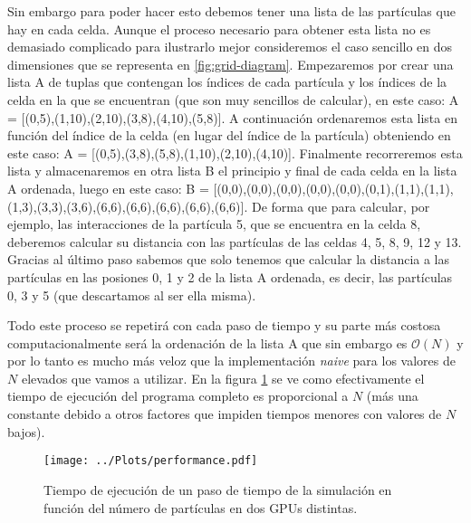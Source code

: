 Sin embargo para poder hacer esto debemos tener una lista de las partículas que hay en cada celda. Aunque el proceso necesario para obtener esta lista no es demasiado complicado para ilustrarlo mejor consideremos el caso sencillo en dos dimensiones que se representa en \ref{fig:grid-diagram}. Empezaremos por crear una lista A de tuplas que contengan los índices de cada partícula y los índices de la celda en la que se encuentran (que son muy sencillos de calcular), en este caso: A = [(0,5),(1,10),(2,10),(3,8),(4,10),(5,8)]. A continuación ordenaremos esta lista en función del índice de la celda (en lugar del índice de la partícula) obteniendo en este caso: A = [(0,5),(3,8),(5,8),(1,10),(2,10),(4,10)]. Finalmente recorreremos esta lista y almacenaremos en otra lista B el principio y final de cada celda en la lista A ordenada, luego en este caso: B = [(0,0),(0,0),(0,0),(0,0),(0,0),(0,1),(1,1),(1,1),(1,3),(3,3),(3,6),(6,6),(6,6),(6,6),(6,6),(6,6)]. De forma que para calcular, por ejemplo, las interacciones de la partícula 5, que se encuentra en la celda 8, deberemos calcular su distancia con las partículas de las celdas 4, 5, 8, 9, 12 y 13. Gracias al último paso sabemos que solo tenemos que calcular la distancia a las partículas en las posiones 0, 1 y 2 de la lista A ordenada, es decir, las partículas 0, 3 y 5 (que descartamos al ser ella misma).

Todo este proceso se repetirá con cada paso de tiempo y su parte más costosa computacionalmente será la ordenación de la lista A que sin embargo es $\mathcal{O}(N)$ y por lo tanto es mucho más veloz que la implementación \textit{naive} para los valores de $N$ elevados que vamos a utilizar. En la figura \ref{fig:performance} se ve como efectivamente el tiempo de ejecución del programa completo es proporcional a $N$ (más una constante debido a otros factores que impiden tiempos menores con valores de $N$ bajos).

\begin{figure}[t]
    \centering
    \texttt{[image: ../Plots/performance.pdf]}
    \caption{Tiempo de ejecución de un paso de tiempo de la simulación en función del número de partículas en dos GPUs distintas.}
    \label{fig:performance}
\end{figure}

